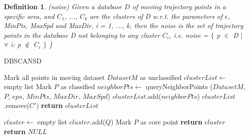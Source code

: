 \documentclass[12pt,glossary]{dalcsthesis}
\newtheorem{definition}{Definition}
\begin{document}
\begin{definition}
\label{def:noise}
(noise)
Given a database $D$ of moving trajectory points in a specific area, and $C_1$, ..., $C_k$ are the clusters of D w.r.t. the parameters of $\epsilon$, MinPts, MaxSpd and MaxDir, i = 1, ..., k, then the noise is the set of trajectory points in the database D not belonging to any cluster $C_i$, i.e. noise = $\{$ p $\in$ D $\mid$ $\forall$ i: p $\notin$ $C_i$ $\}$
\}
\end{definition}


\renewcommand{\algorithmicrequire}{\textbf{Input:}}
\renewcommand{\algorithmicensure}{\textbf{Output:}}


\begin{algorithm}
\caption{DBSCANSD}\label{algo1}
\begin{algorithmic}[1]
\State  Mark all points in moving dataset $DatasetM$ as unclassified
\State $clusterList \gets$ empty list
    \State Mark $P$ as classified
    \State $neighborPts \gets$ queryNeighborPoints ($DatasetM$, $P$, $eps$, $MinPts$, $MaxDir$, $MaxSpd$)
        \State  $clusterList$.add($neighborPts$)
    \EndIf
\EndFor
{}
                             
                \State $clusterList$.remove($C'$)
            \EndIf
        \EndIf
    \EndFor
\EndFor
\State \textbf{return} $clusterList$
\EndProcedure

\State $cluster \gets$ empty list 
                \State $cluster$.add($Q$)
            \EndIf
        \EndIf
    \EndIf
\EndFor
{}
    \State Mark $P$ as core point
    \State \textbf{return} $cluster$
\EndIf
\State \textbf{return} $NULL$
\EndProcedure
{}

\end{algorithmic}
\end{algorithm}
\end{document}
